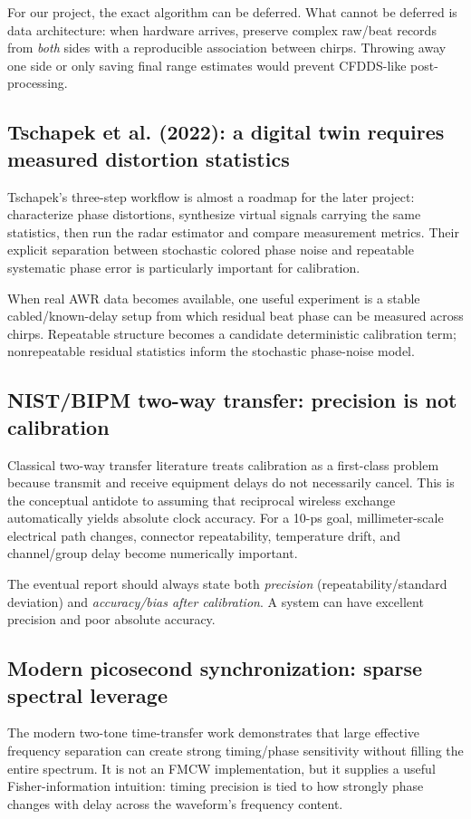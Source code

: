 \documentclass[11pt]{article}
\begin{document}
For our project, the exact algorithm can be deferred. What cannot be deferred is data architecture: when hardware arrives, preserve complex raw/beat records from \emph{both} sides with a reproducible association between chirps. Throwing away one side or only saving final range estimates would prevent CFDDS-like post-processing.

\subsection{Tschapek et al. (2022): a digital twin requires measured distortion statistics}
Tschapek's three-step workflow is almost a roadmap for the later project: characterize phase distortions, synthesize virtual signals carrying the same statistics, then run the radar estimator and compare measurement metrics. Their explicit separation between stochastic colored phase noise and repeatable systematic phase error is particularly important for calibration.

When real AWR data becomes available, one useful experiment is a stable cabled/known-delay setup from which residual beat phase can be measured across chirps. Repeatable structure becomes a candidate deterministic calibration term; nonrepeatable residual statistics inform the stochastic phase-noise model.

\subsection{NIST/BIPM two-way transfer: precision is not calibration}
Classical two-way transfer literature treats calibration as a first-class problem because transmit and receive equipment delays do not necessarily cancel. This is the conceptual antidote to assuming that reciprocal wireless exchange automatically yields absolute clock accuracy. For a 10-ps goal, millimeter-scale electrical path changes, connector repeatability, temperature drift, and channel/group delay become numerically important.

The eventual report should always state both \emph{precision} (repeatability/standard deviation) and \emph{accuracy/bias after calibration}. A system can have excellent precision and poor absolute accuracy.

\subsection{Modern picosecond synchronization: sparse spectral leverage}
The modern two-tone time-transfer work demonstrates that large effective frequency separation can create strong timing/phase sensitivity without filling the entire spectrum. It is not an FMCW implementation, but it supplies a useful Fisher-information intuition: timing precision is tied to how strongly phase changes with delay across the waveform's frequency content.
\end{document}
